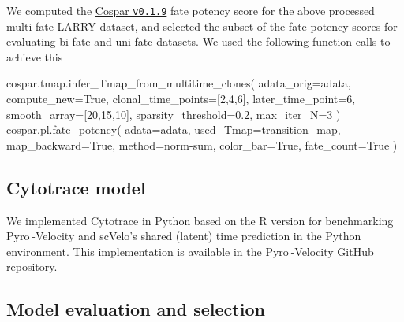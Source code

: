 \documentclass[
  sn-mathphys-num,
  lineno,
  twocolumn]{sn-jnl}
\newenvironment{Shaded}{\begin{snugshade}}{\end{snugshade}}
\newcommand{\DecValTok}[1]{\textcolor[rgb]{0.68,0.00,0.00}{#1}}
\newcommand{\FloatTok}[1]{\textcolor[rgb]{0.68,0.00,0.00}{#1}}
\newcommand{\NormalTok}[1]{\textcolor[rgb]{0.00,0.23,0.31}{#1}}
\newcommand{\OperatorTok}[1]{\textcolor[rgb]{0.37,0.37,0.37}{#1}}
\newcommand{\StringTok}[1]{\textcolor[rgb]{0.13,0.47,0.30}{#1}}
\newcommand{\VariableTok}[1]{\textcolor[rgb]{0.07,0.07,0.07}{#1}}
\begin{document}
We computed the
\href{https://github.com/AllonKleinLab/cospar/releases/tag/v0.1.9}{Cospar
\texttt{v0.1.9}} \citep{Wang2022-xb} fate potency score for the above
processed multi-fate LARRY dataset, and selected the subset of the fate
potency scores for evaluating bi-fate and uni-fate datasets. We used the
following function calls to achieve this

\begin{Shaded}
\begin{Highlighting}[]
\NormalTok{cospar.tmap.infer\_Tmap\_from\_multitime\_clones(}
\NormalTok{  adata\_orig}\OperatorTok{=}\NormalTok{adata, }
\NormalTok{  compute\_new}\OperatorTok{=}\VariableTok{True}\NormalTok{,}
\NormalTok{  clonal\_time\_points}\OperatorTok{=}\NormalTok{[}\DecValTok{2}\NormalTok{,}\DecValTok{4}\NormalTok{,}\DecValTok{6}\NormalTok{], }
\NormalTok{  later\_time\_point}\OperatorTok{=}\DecValTok{6}\NormalTok{,}
\NormalTok{  smooth\_array}\OperatorTok{=}\NormalTok{[}\DecValTok{20}\NormalTok{,}\DecValTok{15}\NormalTok{,}\DecValTok{10}\NormalTok{],}
\NormalTok{  sparsity\_threshold}\OperatorTok{=}\FloatTok{0.2}\NormalTok{, }
\NormalTok{  max\_iter\_N}\OperatorTok{=}\DecValTok{3}
\NormalTok{)}
\NormalTok{cospar.pl.fate\_potency(}
\NormalTok{  adata}\OperatorTok{=}\NormalTok{adata, }
\NormalTok{  used\_Tmap}\OperatorTok{=}\StringTok{\textquotesingle{}transition\_map\textquotesingle{}}\NormalTok{,}
\NormalTok{  map\_backward}\OperatorTok{=}\VariableTok{True}\NormalTok{,}
\NormalTok{  method}\OperatorTok{=}\StringTok{\textquotesingle{}norm{-}sum\textquotesingle{}}\NormalTok{,}
\NormalTok{  color\_bar}\OperatorTok{=}\VariableTok{True}\NormalTok{,}
\NormalTok{  fate\_count}\OperatorTok{=}\VariableTok{True}
\NormalTok{)}
\end{Highlighting}
\end{Shaded}

\subsection{Cytotrace model}\label{sec-methods-cytotrace}

We implemented Cytotrace in Python based on the R version
\citep{Gulati2020-xq} for benchmarking Pyro -Velocity and scVelo's
shared (latent) time prediction in the Python environment. This
implementation is available in the
\href{https://github.com/pinellolab/pyrovelocity/blob/main/src/pyrovelocity/analysis/cytotrace.py}{Pyro -Velocity
GitHub repository}.

\subsection{Model evaluation and
selection}\label{sec-methods-model-selection}
\end{document}
